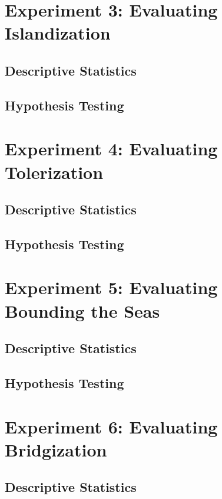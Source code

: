 \documentclass[10pt,nocc]{xrese_report}
\begin{document}
\section{Experiment 3: Evaluating Islandization}

\subsection{Descriptive Statistics}

\subsection{Hypothesis Testing}

\section{Experiment 4: Evaluating Tolerization}

\subsection{Descriptive Statistics}

\subsection{Hypothesis Testing}

\section{Experiment 5: Evaluating Bounding the Seas}

\subsection{Descriptive Statistics}

\subsection{Hypothesis Testing}

\section{Experiment 6: Evaluating Bridgization}

\subsection{Descriptive Statistics}
\end{document}
